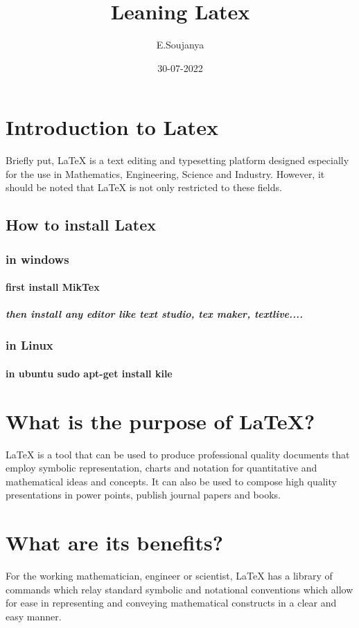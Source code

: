 \documentclass[12pt]{article}
\title{Leaning Latex}
\author{E.Soujanya}
\date{30-07-2022}
\begin{document}
\maketitle
\tableofcontents
\section{Introduction to Latex}

Briefly put, LaTeX is a text editing and typesetting platform designed
especially for the use in Mathematics, Engineering, Science and Industry.
However, it should be noted that LaTeX is not only restricted to these
fields.
\subsection{How to install Latex}
\subsubsection{in windows}
\paragraph{first install MikTex}
\subparagraph{then install any editor like text studio, tex maker, textlive....}
\subsubsection{in Linux}
\paragraph{in ubuntu sudo apt-get install kile}

\section{What is the purpose of LaTeX?}
LaTeX is a tool that can be used to produce professional quality
documents that employ symbolic representation, charts and notation for
quantitative and mathematical ideas and concepts. It can also be used to
compose high quality presentations in power points, publish journal papers
and books.
\section{What are its benefits?}


For the working mathematician, engineer or scientist, LaTeX has a library
of commands which relay standard symbolic and notational conventions
which allow for ease in representing and conveying mathematical
constructs in a clear and easy manner.
\end{document}
